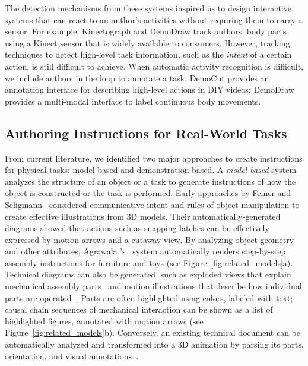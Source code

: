 The detection mechanisms from these systems inspired us to design interactive systems that can react to an author's activities without requiring them to carry  a sensor. For example, Kinectograph and DemoDraw track authors' body parts using a Kinect sensor that is widely available to consumers.
%
However, tracking techniques to detect high-level task information, such as the \emph{intent} of a certain action, is still difficult to achieve. When automatic activity recognition is difficult, we include authors in the loop to annotate a task. DemoCut provides an annotation interface for describing high-level actions in DIY videos; DemoDraw provides a multi-modal interface to label continuous body movements.



\subsection{Authoring Instructions for Real-World Tasks}

From current literature, we identified two major approaches to create instructions for physical tasks: model-based and demonstration-based.
%
A \emph{model-based} system analyzes the structure of an object or a task to generate instructions of how the object is constructed or the task is performed.
%
Early approaches by Feiner and Seligmann~\cite{feiner:1985:AEA:1299975.1300548,Seligmann:1991:AGI:127719.122732} considered communicative intent and rules of object manipulation to create effective illustrations from 3D models. Their automatically-generated diagrams showed that actions such as snapping latches can be effectively expressed by motion arrows and a cutaway view.
%
By analyzing object geometry and other attributes, Agrawala \ea{}'s~\cite{agrawala2003designing} system automatically renders step-by-step assembly instructions for furniture and toys (see Figure~\ref{fig:related_models}a).
%
Technical diagrams can also be generated, such as exploded views that explain mechanical assembly parts~\cite{li2008automated} and motion illustrations that describe how individual parts are operated~\cite{mitra2010illustrating}. Parts are often highlighted using colors, labeled with text; causal chain sequences of mechanical interaction can be shown as a list of highlighted figures, annotated with motion arrows (see Figure~\ref{fig:related_models}b).
%
Conversely, an existing technical document can be automatically analyzed and transformed into a 3D animation by parsing its parts, orientation, and visual annotations~\cite{Mohr:2015:RTD:2702123.2702490}.


